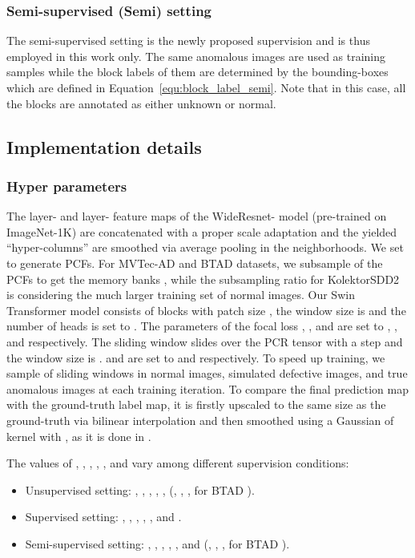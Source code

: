 \subsubsection{Semi-supervised (Semi) setting} 
The semi-supervised setting is the newly proposed supervision and is thus employed in this
work only. The same  anomalous images are used as training samples while the block
labels of them are determined by the bounding-boxes which are defined in
Equation~\ref{equ:block_label_semi}. Note that in this case, all the blocks are annotated as
either unknown or normal. 

\subsection{Implementation details}
\subsubsection{Hyper parameters}
The layer- and layer- feature maps of the
Wide\-Resnet- model
\citep{zagoruyko2016wide} (pre-trained on ImageNet-1K) are concatenated with a proper scale
adaptation and the yielded  ``hyper-columns'' are smoothed via average
pooling in the  neighborhoods. We set  to
generate PCFs. 
For MVTec-AD \citep{bergmann2019mvtec} and BTAD \citep{mishra2021vt} datasets, we subsample
 of the PCFs to get the memory banks , while the
subsampling ratio for KolektorSDD2 \citep{bovzivc2021mixed-KolektorSDD2} is 
considering the much larger training set of normal images. 
Our Swin Transformer model  consists of  blocks with patch
size , the window size is  and the number of heads is set to . 
The parameters of the focal loss , ,  and 
are set to , ,  and  respectively. 
The sliding window  slides over the PCR tensor with a step  and the
window size is .  and  are set to  and  respectively.  To
speed up training, we sample  of sliding windows in  normal images, 
simulated defective images, and  true anomalous images at each training iteration. 
To compare the final prediction map  with the ground-truth label map, it is
firstly upscaled to the same size as the ground-truth via bilinear interpolation and then
smoothed using a Gaussian of kernel with , as it is done in
\citep{roth2022towards}. 

The values of , , , , ,  and  vary among
different supervision conditions:
\begin{itemize}
    \item Unsupervised setting: , , ,
      , ,  (, ,
      ,  for BTAD \citep{mishra2021vt}). 
    \item Supervised setting: , , ,
      , ,  and .
    \item Semi-supervised setting: , , ,
      ,  ,  and  (,
      , ,  for BTAD \citep{mishra2021vt}). 
\end{itemize}

